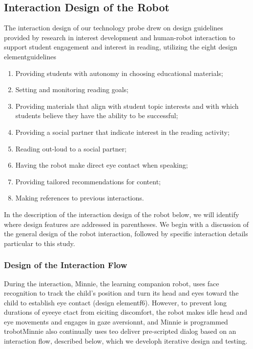 \documentclass{sigchi}
\begin{document}
\subsection{Interaction Design of the Robot}

The interaction design of our technology probe drew on design guidelines provided by research in interest development and human-robot interaction to support student engagement and interest in reading, utilizing the eight design elementguidelines 

\begin{enumerate}
\setlength\itemsep{-0.5pt}
\item Providing students with autonomy in choosing educational materials;
\item Setting and monitoring reading goals;
\item Providing materials that align with student topic interests and with which students believe they have the ability to be successful;
\item Providing a social partner that indicate interest in the reading activity;
\item Reading out-loud to a social partner;
\item Having the robot make direct eye contact when speaking;
\item Providing tailored recommendations for content;
\item Making references to previous interactions. 
\end{enumerate}


 In the description of the interaction design of the robot below, we will identify where design features are addressed in parentheses. We begin with a discussion of the general design of the robot interaction, followed by specific interaction details particular to this study.

\subsubsection{Design of the Interaction Flow}

During the interaction, Minnie, the learning companion robot, uses face recognition to track the child's position and turn its head and eyes toward the child to establish eye contact (design elementf6). However, to prevent long durations of eyeeye ctact from eiciting discomfort, the robot makes idle head and eye movements and engages in gaze aversionnt, and Minnie is programmed trobotMinnie also continually uses teo deliver pre-scripted dialog based on an interaction flow, described below, which we developh iterative design and testing.
\end{document}
